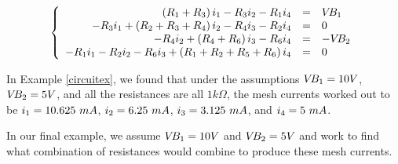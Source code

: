 \[ \left\{ \begin{array}{rcl} \left(R_{\text{\scriptsize$1$}} + R_{\text{\scriptsize$3$}}\right)i_{\text{\scriptsize$1$}} - R_{\text{\scriptsize$3$}}i_{\text{\scriptsize$2$}} - R_{\text{\scriptsize$1$}}i_{\text{\scriptsize$4$}} & = & V\!B_{\text{\scriptsize$1$}} \\
-R_{\text{\scriptsize$3$}}i_{\text{\scriptsize$1$}} + \left(R_{\text{\scriptsize$2$}} + R_{\text{\scriptsize$3$}} + R_{\text{\scriptsize$4$}}\right)i_{\text{\scriptsize$2$}} - R_{\text{\scriptsize$4$}}i_{\text{\scriptsize$3$}} - R_{\text{\scriptsize$2$}}i_{\text{\scriptsize$4$}} & = & 0 \\
-R_{\text{\scriptsize$4$}}i_{\text{\scriptsize$2$}} + \left(R_{\text{\scriptsize$4$}} + R_{\text{\scriptsize$6$}}\right)i_{\text{\scriptsize$3$}} - R_{\text{\scriptsize$6$}}i_{\text{\scriptsize$4$}} & = & -V\!B_{\text{\scriptsize$2$}} \\
-R_{\text{\scriptsize$1$}}i_{\text{\scriptsize$1$}} - R_{\text{\scriptsize$2$}}i_{\text{\scriptsize$2$}} - R_{\text{\scriptsize$6$}}i_{\text{\scriptsize$3$}} + \left(R_{\text{\scriptsize$1$}} + R_{\text{\scriptsize$2$}} + R_{\text{\scriptsize$5$}} + R_{\text{\scriptsize$6$}}\right)i_{\text{\scriptsize$4$}} & = & 0 \\  \end{array} \right.\]

In Example \ref{circuitex}, we found that under the assumptions $V\!B_{\text{\scriptsize$1$}} = 10 V$, $V\!B_{\text{\scriptsize$2$}} = 5 V$, and all  the resistances are all $1 k\Omega$, the mesh currents worked out to be $i_{\text{\scriptsize$1$}} = 10.625 \, \, mA$, $i_{\text{\scriptsize$2$}} = 6.25 \, \, mA$, $i_{\text{\scriptsize$3$}} = 3.125 \, \, mA$, and $i_{\text{\scriptsize$4$}} = 5 \, \, mA$. 

 In our final example, we assume  $V\!B_{\text{\scriptsize$1$}} = 10 V$ and  $V\!B_{\text{\scriptsize$2$}} = 5 V$  and work to find what combination of resistances would combine to produce these mesh currents.
 

